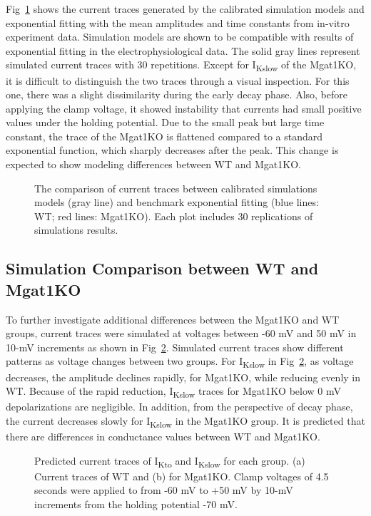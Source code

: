 \documentclass[10pt,letterpaper]{article}
\begin{document}
Fig~\ref{fig6} shows the current traces generated by the calibrated simulation models and exponential fitting with the mean amplitudes and time constants from in-vitro experiment data. Simulation models are shown to be compatible with results of exponential fitting in the electrophysiological data. The solid gray lines represent simulated current traces with 30 repetitions. Except for I\textsubscript{Kslow} of the Mgat1KO, it is difficult to distinguish the two traces through a visual inspection. For this one, there was a slight dissimilarity during the early decay phase. Also, before applying the clamp voltage, it showed instability that currents had small positive values under the holding potential. Due to the small peak but large time constant, the trace of the Mgat1KO is flattened compared to a standard exponential function, which sharply decreases after the peak. This change is expected to show modeling differences between WT and Mgat1KO.

\begin{figure}[!ht]
    \centering
    \caption{The comparison of current traces between calibrated simulations models (gray line) and benchmark exponential fitting (blue lines: WT; red lines: Mgat1KO). Each plot includes 30 replications of simulations results.}
    \label{fig6}
\end{figure}

\subsection*{Simulation Comparison between WT and Mgat1KO}
To further investigate additional differences between the Mgat1KO and WT groups, current traces were simulated at voltages between -60 mV and 50 mV in 10-mV increments as shown in Fig~\ref{fig7}. Simulated current traces show different patterns as voltage changes between two groups. For I\textsubscript{Kslow} in Fig~\ref{fig7}, as voltage decreases, the amplitude declines rapidly, for Mgat1KO, while reducing evenly in WT. Because of the rapid reduction, I\textsubscript{Kslow} traces for Mgat1KO below 0 mV depolarizations are negligible. In addition, from the perspective of decay phase, the current decreases slowly for I\textsubscript{Kslow} in the Mgat1KO group. It is predicted that there are differences in conductance values between WT and Mgat1KO.

\begin{figure}[!ht]
    \centering
    \caption{Predicted current traces of I\textsubscript{Kto} and I\textsubscript{Kslow} for each group. (a) Current traces of WT and (b) for Mgat1KO. Clamp voltages of 4.5 seconds were applied to from -60 mV to +50 mV by 10-mV increments from the holding potential -70 mV.}
    \label{fig7}
\end{figure}
\end{document}
